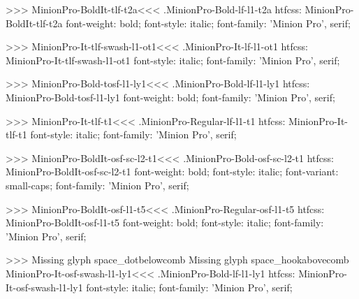 {>>>
\<MinionPro-BoldIt-tlf-t2a\><<<
.MinionPro-Bold-lf-l1-t2a
htfcss:  MinionPro-BoldIt-tlf-t2a  font-weight: bold; font-style: italic; font-family: 'Minion Pro', serif;

>>>
\<MinionPro-It-tlf-swash-l1-ot1\><<<
.MinionPro-It-lf-l1-ot1
htfcss:  MinionPro-It-tlf-swash-l1-ot1  font-style: italic; font-family: 'Minion Pro', serif;

>>>
\<MinionPro-Bold-tosf-l1-ly1\><<<
.MinionPro-Bold-lf-l1-ly1
htfcss:  MinionPro-Bold-tosf-l1-ly1  font-weight: bold; font-family: 'Minion Pro', serif;

>>>
\<MinionPro-It-tlf-t1\><<<
.MinionPro-Regular-lf-l1-t1
htfcss:  MinionPro-It-tlf-t1  font-style: italic; font-family: 'Minion Pro', serif;

>>>
\<MinionPro-BoldIt-osf-sc-l2-t1\><<<
.MinionPro-Bold-osf-sc-l2-t1
htfcss:  MinionPro-BoldIt-osf-sc-l2-t1  font-weight: bold; font-style: italic; font-variant: small-caps; font-family: 'Minion Pro', serif;

>>>
\<MinionPro-BoldIt-osf-l1-t5\><<<
.MinionPro-Regular-osf-l1-t5
htfcss:  MinionPro-BoldIt-osf-l1-t5  font-weight: bold; font-style: italic; font-family: 'Minion Pro', serif;

>>>
Missing glyph	space_dotbelowcomb
Missing glyph	space_hookabovecomb
\<MinionPro-It-osf-swash-l1-ly1\><<<
.MinionPro-Bold-lf-l1-ly1
htfcss:  MinionPro-It-osf-swash-l1-ly1  font-style: italic; font-family: 'Minion Pro', serif;

}
